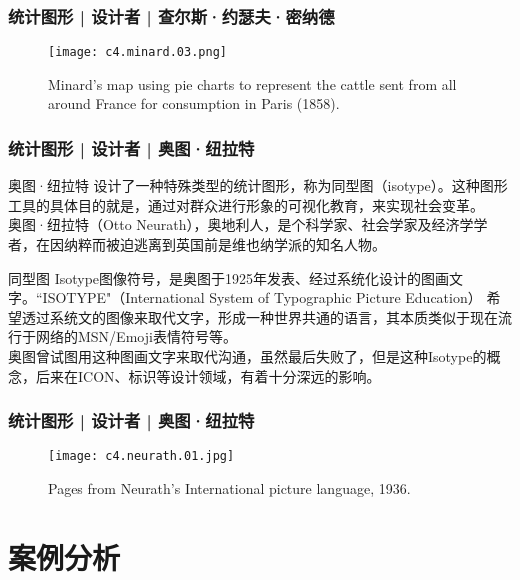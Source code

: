 \begin{frame}
  \frametitle{统计图形 | 设计者 | 查尔斯·约瑟夫·密纳德}
  \begin{figure}
    \centering
    \texttt{[image: c4.minard.03.png]}
    \caption{Minard's map using pie charts to represent the cattle sent from all around France for consumption in Paris (1858).}
  \end{figure}
\end{frame}

\begin{frame}
  \frametitle{统计图形 | 设计者 | 奥图·纽拉特}
  \begin{block}{奥图·纽拉特}
    设计了一种特殊类型的统计图形，称为同型图（isotype）。这种图形工具的具体目的就是，通过对群众进行形象的可视化教育，来实现社会变革。\\
    \vspace{0.5em}
奥图·纽拉特（Otto Neurath），奥地利人，是个科学家、社会学家及经济学学者，在因纳粹而被迫逃离到英国前是维也纳学派的知名人物。    
  \end{block}
  \pause
  \begin{block}{同型图}
    Isotype图像符号，是奥图于1925年发表、经过系统化设计的图画文字。``ISOTYPE"（International System of Typographic Picture Education） 希望透过系统文的图像来取代文字，形成一种世界共通的语言，其本质类似于现在流行于网络的MSN/Emoji表情符号等。\\
    \vspace{0.5em}
    奥图曾试图用这种图画文字来取代沟通，虽然最后失败了，但是这种Isotype的概念，后来在ICON、标识等设计领域，有着十分深远的影响。
  \end{block}
\end{frame}

\begin{frame}
  \frametitle{统计图形 | 设计者 | 奥图·纽拉特}
  \begin{figure}
    \centering
    \texttt{[image: c4.neurath.01.jpg]}
    \caption{Pages from Neurath's International picture language, 1936.}
  \end{figure}
\end{frame}

\section{案例分析}
